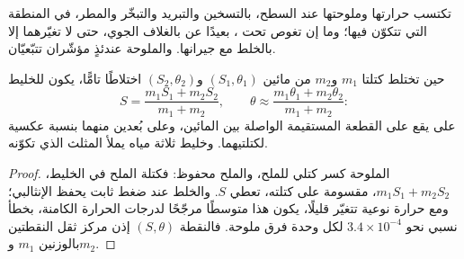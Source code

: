 تكتسب  حرارتها وملوحتها عند السطح، بالتسخين والتبريد والتبخّر والمطر، في المنطقة التي تتكوّن فيها؛ وما إن تغوص تحت ، بعيدًا عن  بالغلاف الجوي، حتى لا تغيّرهما إلا بالخلط مع جيرانها.  والملوحة عندئذٍ مؤشّران تتبّعيّان.

\begin{proposition}\label{prop:b1:fluid-envelopes-structure:mixing}
حين تختلط كتلتا $m_1$ و$m_2$ من مائين $(S_1, \theta_1)$ و$(S_2, \theta_2)$ اختلاطًا تامًّا، يكون للخليط
\[
  S = \frac{m_1 S_1 + m_2 S_2}{m_1 + m_2},\qquad
  \theta \approx \frac{m_1 \theta_1 + m_2 \theta_2}{m_1 + m_2}:
\]
على  يقع على القطعة المستقيمة الواصلة بين المائين، وعلى بُعدين منهما بنسبة عكسية لكتلتيهما. وخليط ثلاثة مياه يملأ المثلث الذي تكوّنه.
\end{proposition}

\begin{proof}
الملوحة كسر كتلي للملح، والملح محفوظ: فكتلة الملح في الخليط، $m_1 S_1 + m_2 S_2$، مقسومة على كتلته، تعطي $S$. والخلط عند ضغط ثابت يحفظ الإنثالبي؛ ومع حرارة نوعية تتغيّر قليلًا، يكون هذا متوسطًا مرجّحًا لدرجات الحرارة الكامنة، بخطأ نسبي نحو $3.4\times10^{-4}$ لكل وحدة فرق ملوحة. فالنقطة $(S, \theta)$ إذن مركز ثقل النقطتين بالوزنين $m_1$ و$m_2$.
\end{proof}

